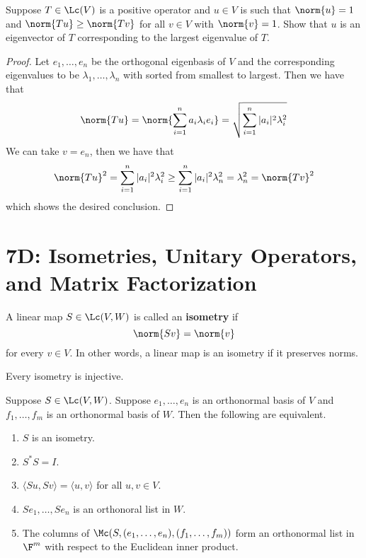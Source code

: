 \documentclass{extarticle}
\begin{document}
\begin{problem}{22}
    Suppose \(T \in \Lc(V)\) is a positive operator and \(u \in V\) is such that
    \(\norm{u} =1\) and \(\norm{Tu} \geq \norm{Tv}\) for all \(v \in V\) with \(\norm{v} = 1\).
    Show that \(u\) is an eigenvector of \(T\) corresponding to the largest eigenvalue of \(T\).
\end{problem}

\begin{proof}
Let \(e_1, \ldots, e_n\) be the orthogonal eigenbasis of \(V\) and the corresponding eigenvalues
to be \(\lambda_1, \ldots, \lambda_n\) with sorted from smallest to largest. Then we have that
\[\norm{Tu} = \norm{\sum_{i=1}^{n} a_i \lambda_i e_i} = \sqrt{\sum_{i=1}^{n} |a_i|^2 \lambda_i^2}\]
We can take \(v = e_n\), then we have that
\[\norm{Tu}^2 = \sum_{i=1}^{n} |a_i|^2 \lambda_i^2 \geq \sum_{i=1}^{n} |a_i|^2 \lambda_n^2
= \lambda_n^2 = \norm{Tv}^2\]
which shows the desired conclusion.
\end{proof}


\newpage
\section*{7D: Isometries, Unitary Operators, and Matrix Factorization}

\begin{definition}[isometry]
    A linear map \(S \in \Lc(V, W)\) is called an \textbf{isometry} if
    \[\norm{Sv} = \norm{v}\]
    for every \(v \in V\). In other words, a linear map is an isometry if it preserves norms.
\end{definition}

\begin{remark}
    Every isometry is injective.
\end{remark}

\begin{thm}
    Suppose \(S \in \Lc(V, W)\). Suppose \(e_1, \ldots, e_n\) is an orthonormal basis of \(V\)
    and \(f_1, \ldots, f_m\) is an orthonormal basis of \(W\). Then the following are equivalent.
    \begin{enumerate}[label=(\alph*)]
        \item \(S\) is an isometry.
        \item \(S^* S = I\).
        \item \(\langle Su,Sv \rangle = \langle u,v \rangle\) for all \(u, v \in V\).
        \item \(Se_1, \ldots, Se_n\) is an orthonoral list in \(W\).
        \item The columns of \(\Mc(S, (e_1, \ldots, e_n), (f_1, \ldots, f_m))\) form an orthonormal
        list in \(\F^m\) with respect to the Euclidean inner product.
    \end{enumerate}
\end{thm}
\end{document}
